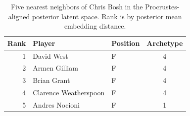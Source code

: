 \begin{table}[htbp]
  \centering\small
  \begin{tabular}{rllc}
    \toprule
    Rank & Player & Position & Archetype \\
    \midrule
    1 & David West & F & 4 \\
    2 & Armen Gilliam & F & 4 \\
    3 & Brian Grant & F & 4 \\
    4 & Clarence Weatherspoon & F & 4 \\
    5 & Andres Nocioni & F & 1 \\
    \bottomrule
  \end{tabular}
  \caption{Five nearest neighbors of Chris Bosh in the Procrustes-aligned posterior latent space. Rank is by posterior mean embedding distance.}
  \label{tab:Chris_Bosh_neighbors}
\end{table}

